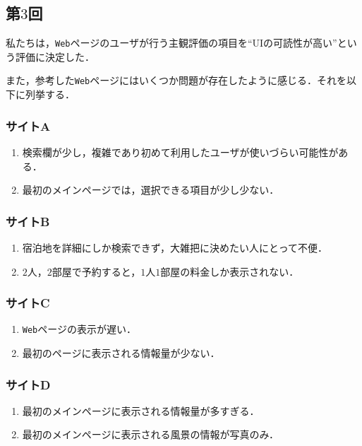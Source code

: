 \documentclass{jlreq}
\begin{document}
  \subsection*{第$3$回}
  私たちは，\verb|Web|ページのユーザが行う主観評価の項目を``UIの可読性が高い''という評価に決定した．

  また，参考した\verb|Web|ページにはいくつか問題が存在したように感じる．それを以下に列挙する．
  \subsubsection*{サイトA}
  \begin{enumerate}[(1). ]
    \item 検索欄が少し，複雑であり初めて利用したユーザが使いづらい可能性がある．
    \item 最初のメインページでは，選択できる項目が少し少ない．
  \end{enumerate}

  \subsubsection*{サイトB}
  \begin{enumerate}[(1). ]
    \item 宿泊地を詳細にしか検索できず，大雑把に決めたい人にとって不便．
    \item $2$人，$2$部屋で予約すると，$1$人$1$部屋の料金しか表示されない．
  \end{enumerate}
  
  \subsubsection*{サイトC}
  \begin{enumerate}[(1). ]
    \item \verb|Web|ページの表示が遅い．
    \item 最初のページに表示される情報量が少ない．
  \end{enumerate}

  \subsubsection*{サイトD}
  \begin{enumerate}[(1). ]
    \item 最初のメインページに表示される情報量が多すぎる．
    \item 最初のメインページに表示される風景の情報が写真のみ．
  \end{enumerate}
\end{document}
